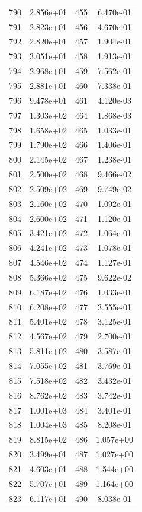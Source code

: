 \documentclass[12pt]{article}
\begin{document}
\begin{longtable}{@{}cccc@{}}
790 & 2.856e+01 & 455 & 6.470e-01 \\
791 & 2.823e+01 & 456 & 4.670e-01 \\
792 & 2.820e+01 & 457 & 1.904e-01 \\
793 & 3.051e+01 & 458 & 1.913e-01 \\
794 & 2.968e+01 & 459 & 7.562e-01 \\
795 & 2.881e+01 & 460 & 7.338e-01 \\
796 & 9.478e+01 & 461 & 4.120e-03 \\
797 & 1.303e+02 & 464 & 1.868e-03 \\
798 & 1.658e+02 & 465 & 1.033e-01 \\
799 & 1.790e+02 & 466 & 1.406e-01 \\
800 & 2.145e+02 & 467 & 1.238e-01 \\
801 & 2.500e+02 & 468 & 9.466e-02 \\
802 & 2.509e+02 & 469 & 9.749e-02 \\
803 & 2.160e+02 & 470 & 1.092e-01 \\
804 & 2.600e+02 & 471 & 1.120e-01 \\
805 & 3.421e+02 & 472 & 1.064e-01 \\
806 & 4.241e+02 & 473 & 1.078e-01 \\
807 & 4.546e+02 & 474 & 1.127e-01 \\
808 & 5.366e+02 & 475 & 9.622e-02 \\
809 & 6.187e+02 & 476 & 1.033e-01 \\
810 & 6.208e+02 & 477 & 3.555e-01 \\
811 & 5.401e+02 & 478 & 3.125e-01 \\
812 & 4.567e+02 & 479 & 2.700e-01 \\
813 & 5.811e+02 & 480 & 3.587e-01 \\
814 & 7.055e+02 & 481 & 3.769e-01 \\
815 & 7.518e+02 & 482 & 3.432e-01 \\
816 & 8.762e+02 & 483 & 3.742e-01 \\
817 & 1.001e+03 & 484 & 3.401e-01 \\
818 & 1.004e+03 & 485 & 8.208e-01 \\
819 & 8.815e+02 & 486 & 1.057e+00 \\
820 & 3.499e+01 & 487 & 1.027e+00 \\
821 & 4.603e+01 & 488 & 1.544e+00 \\
822 & 5.707e+01 & 489 & 1.164e+00 \\
823 & 6.117e+01 & 490 & 8.038e-01 \\

\end{longtable}
\end{document}
